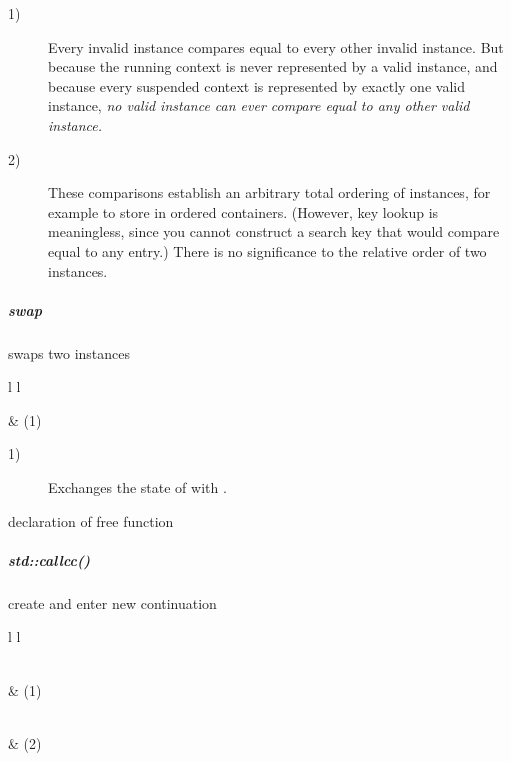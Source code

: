 \begin{description}
    \item[1)] Every invalid \cont instance compares equal to every other
              invalid instance. But because the running context is never
              represented by a valid \cont instance, and because every
              suspended context is represented by exactly one valid
              instance, \emph{no valid instance can ever compare equal to any
              other valid instance.}
    \item[2)] These comparisons establish an arbitrary total ordering of \cont
              instances, for example to store in ordered containers. (However,
              key lookup is meaningless, since you cannot construct a search
              key that would compare equal to any entry.) There is no
              significance to the relative order of two instances.
\end{description}

\subparagraph*{swap}
swaps two \cont instances\\

\begin{tabular}{ l l }
    \midrule

     & (1)\\

    \midrule
\end{tabular}

\begin{description}
    \item[1)] Exchanges the state of  with .\\
\end{description}


declaration of free function \call
{}

\subparagraph*{std::callcc()}
create and enter new continuation\\

\begin{tabular}{ l l }
    \midrule

    \\
     & (1)\\

    \midrule

    \\
     & (2)\\

    \midrule
\end{tabular}

